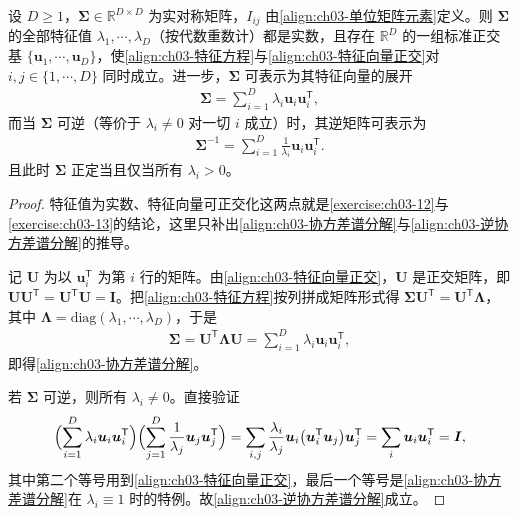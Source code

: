 \documentclass[../../main.tex]{subfiles}
\begin{document}
\begin{proposition}[实对称协方差矩阵的谱性质]\label{proposition:ch03-协方差谱分解}
设 $D\geqslant1$，$\boldsymbol{\Sigma}\in\mathbb{R}^{D\times D}$ 为实对称矩阵，$I_{ij}$ 由\eqref{align:ch03-单位矩阵元素}定义。则 $\boldsymbol{\Sigma}$ 的全部特征值 $\lambda_1,\cdots,\lambda_D$（按代数重数计）都是实数，且存在 $\mathbb{R}^{D}$ 的一组标准正交基 $\{\boldsymbol{u}_1,\cdots,\boldsymbol{u}_D\}$，使\eqref{align:ch03-特征方程}与\eqref{align:ch03-特征向量正交}对 $i,j\in\{1,\cdots,D\}$ 同时成立。进一步，$\boldsymbol{\Sigma}$ 可表示为其特征向量的展开
\begin{align}
\boldsymbol{\Sigma}=\sum_{i=1}^{D}\lambda_{i}\boldsymbol{u}_{i}\boldsymbol{u}_{i}^{\mathsf{T}},
\label{align:ch03-协方差谱分解}
\end{align}
而当 $\boldsymbol{\Sigma}$ 可逆（等价于 $\lambda_i\neq0$ 对一切 $i$ 成立）时，其逆矩阵可表示为
\begin{align}
\boldsymbol{\Sigma}^{-1}=\sum_{i=1}^{D}\frac{1}{\lambda_{i}}\boldsymbol{u}_{i}\boldsymbol{u}_{i}^{\mathsf{T}}.
\label{align:ch03-逆协方差谱分解}
\end{align}
且此时 $\boldsymbol{\Sigma}$ 正定当且仅当所有 $\lambda_i>0$。
\end{proposition}
\begin{proof}
特征值为实数、特征向量可正交化这两点就是\cref{exercise:ch03-12}与\cref{exercise:ch03-13}的结论，这里只补出\eqref{align:ch03-协方差谱分解}与\eqref{align:ch03-逆协方差谱分解}的推导。

记 $\boldsymbol{U}$ 为以 $\boldsymbol{u}_i^{\mathsf{T}}$ 为第 $i$ 行的矩阵。由\eqref{align:ch03-特征向量正交}，$\boldsymbol{U}$ 是正交矩阵，即 $\boldsymbol{U}\boldsymbol{U}^{\mathsf{T}}=\boldsymbol{U}^{\mathsf{T}}\boldsymbol{U}=\boldsymbol{I}$。把\eqref{align:ch03-特征方程}按列拼成矩阵形式得 $\boldsymbol{\Sigma}\boldsymbol{U}^{\mathsf{T}}=\boldsymbol{U}^{\mathsf{T}}\boldsymbol{\Lambda}$，其中 $\boldsymbol{\Lambda}=\mathrm{diag}(\lambda_1,\cdots,\lambda_D)$，于是
\begin{align*}
\boldsymbol{\Sigma}=\boldsymbol{U}^{\mathsf{T}}\boldsymbol{\Lambda}\boldsymbol{U}=\sum_{i=1}^{D}\lambda_{i}\boldsymbol{u}_{i}\boldsymbol{u}_{i}^{\mathsf{T}},
\end{align*}
即得\eqref{align:ch03-协方差谱分解}。

若 $\boldsymbol{\Sigma}$ 可逆，则所有 $\lambda_i\neq0$。直接验证
\begin{align*}
\Bigl(\sum_{i=1}^{D}\lambda_{i}\boldsymbol{u}_{i}\boldsymbol{u}_{i}^{\mathsf{T}}\Bigr)\Bigl(\sum_{j=1}^{D}\frac{1}{\lambda_{j}}\boldsymbol{u}_{j}\boldsymbol{u}_{j}^{\mathsf{T}}\Bigr)=\sum_{i,j}\frac{\lambda_i}{\lambda_j}\boldsymbol{u}_{i}\bigl(\boldsymbol{u}_{i}^{\mathsf{T}}\boldsymbol{u}_{j}\bigr)\boldsymbol{u}_{j}^{\mathsf{T}}=\sum_{i}\boldsymbol{u}_{i}\boldsymbol{u}_{i}^{\mathsf{T}}=\boldsymbol{I},
\end{align*}
其中第二个等号用到\eqref{align:ch03-特征向量正交}，最后一个等号是\eqref{align:ch03-协方差谱分解}在 $\lambda_i\equiv1$ 时的特例。故\eqref{align:ch03-逆协方差谱分解}成立。
\end{proof}
\end{document}

